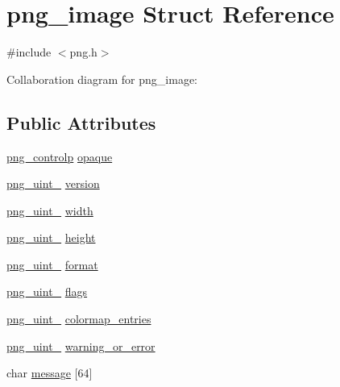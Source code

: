 \hypertarget{structpng__image}{}\section{png\+\_\+image Struct Reference}
\label{structpng__image}


{\ttfamily \#include $<$png.\+h$>$}



Collaboration diagram for png\+\_\+image\+:
\subsection*{Public Attributes}
\begin{DoxyCompactItemize}
\item 
\hyperlink{png_8h_a471eb31de97c923a5fb8b79708475c13}{png\+\_\+controlp} \hyperlink{structpng__image_a7b502596648744e2ee0c8788e2c6e918}{opaque}
\item 
\hyperlink{pngrutil_8c_a89824d0e9f0724e3e7799b01a2b5fe58}{png\+\_\+uint\+\_} \hyperlink{structpng__image_a8c276ba2922051ff0ff9175ab1e23ed1}{version}
\item 
\hyperlink{pngrutil_8c_a89824d0e9f0724e3e7799b01a2b5fe58}{png\+\_\+uint\+\_} \hyperlink{structpng__image_a72ec07853c82c632c2d7b3c68c62b659}{width}
\item 
\hyperlink{pngrutil_8c_a89824d0e9f0724e3e7799b01a2b5fe58}{png\+\_\+uint\+\_} \hyperlink{structpng__image_aaf3cb3eb97ee0938a5e870a96fd1fa48}{height}
\item 
\hyperlink{pngrutil_8c_a89824d0e9f0724e3e7799b01a2b5fe58}{png\+\_\+uint\+\_} \hyperlink{structpng__image_a8a7469310ce4682932b0bc94624f35d1}{format}
\item 
\hyperlink{pngrutil_8c_a89824d0e9f0724e3e7799b01a2b5fe58}{png\+\_\+uint\+\_} \hyperlink{structpng__image_ab9519ecd9acf79b507dad566cc3b379f}{flags}
\item 
\hyperlink{pngrutil_8c_a89824d0e9f0724e3e7799b01a2b5fe58}{png\+\_\+uint\+\_} \hyperlink{structpng__image_a48bf1c6518f03da900f41cd9aa5ae5b7}{colormap\+\_\+entries}
\item 
\hyperlink{pngrutil_8c_a89824d0e9f0724e3e7799b01a2b5fe58}{png\+\_\+uint\+\_} \hyperlink{structpng__image_a1b6e296964e81414b0a1cf232ffbcfce}{warning\+\_\+or\+\_\+error}
\item 
char \hyperlink{structpng__image_a36b2fdbf312f7b8e025d3c224a746130}{message} \mbox{[}64\mbox{]}
\end{DoxyCompactItemize}


